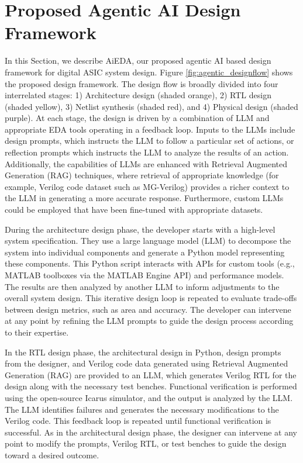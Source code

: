 \section{Proposed Agentic AI Design Framework}
\label{sec:agentic}

In this Section, we describe AiEDA, our proposed agentic AI based design framework for digital ASIC system design. Figure \ref{fig:agentic_designflow} shows the proposed design  framework. The design flow is broadly divided into four interrelated stages: 1) Architecture design (shaded orange), 2) RTL design (shaded yellow), 3) Netlist synthesis (shaded red), and 4) Physical design (shaded purple). At each stage, the design is driven by a combination of LLM and appropriate EDA tools operating in a feedback loop. Inputs to the LLMs include design prompts, which instructs the LLM to follow a particular set of actions, or reflection prompts which instructs the LLM to analyze the results of an action. Additionally, the capabilities of LLMs are enhanced with Retrieval Augmented Generation (RAG) techniques, where retrieval of appropriate knowledge (for example, Verilog code dataset such as MG-Verilog) provides a richer context to the LLM in generating a more accurate response. Furthermore, custom LLMs could be employed that have been fine-tuned with appropriate datasets.


During the architecture design phase, the developer starts with a high-level system specification. They use a large language model (LLM) to decompose the system into individual components and generate a Python model representing these components. This Python script interacts with APIs for custom tools (e.g., MATLAB toolboxes via the MATLAB Engine API) and performance models. The results are then analyzed by another LLM to inform adjustments to the overall system design. This iterative design loop is repeated to evaluate trade-offs between design metrics, such as area and accuracy. The developer can intervene at any point by refining the LLM prompts to guide the design process according to their expertise.

In the RTL design phase, the architectural design in Python, design prompts from the designer, and Verilog code data generated using Retrieval Augmented Generation (RAG) are provided to an LLM, which generates Verilog RTL for the design along with the necessary test benches. Functional verification is performed using the open-source Icarus simulator, and the output is analyzed by the LLM. The LLM identifies failures and generates the necessary modifications to the Verilog code. This feedback loop is repeated until functional verification is successful. As in the architectural design phase, the designer can intervene at any point to modify the prompts, Verilog RTL, or test benches to guide the design toward a desired outcome.

